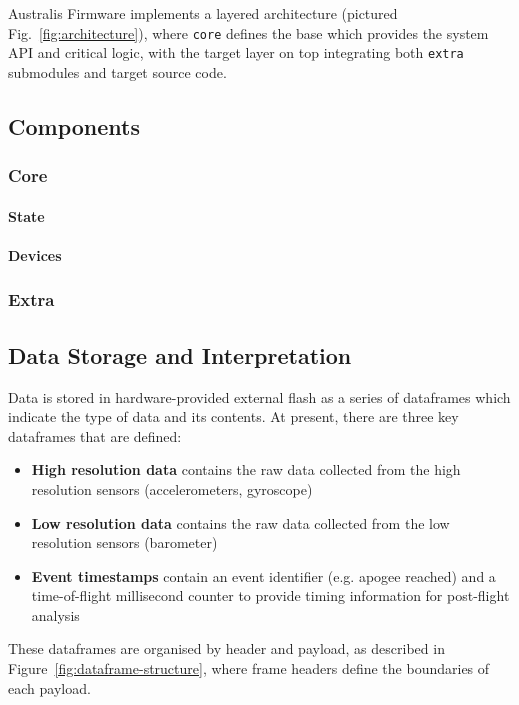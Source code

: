 Australis Firmware implements a layered architecture (pictured Fig.~\ref{fig:architecture}), where \verb|core| defines the base which provides the system API and critical logic, with the target layer on top integrating both \verb|extra| submodules and target source code.

\subsection{Components}

\subsubsection{Core}
\paragraph{State}
\paragraph{Devices}

\subsubsection{Extra}

\subsection{Data Storage and Interpretation}
Data is stored in hardware-provided external flash as a series of dataframes which indicate the type of data and its contents. At present, there are three key dataframes that are defined: 

\vspace{-0.5em}
\begin{itemize}
    \item \textbf{High resolution data} contains the raw data collected from the high resolution sensors (accelerometers, gyroscope)
    \item \textbf{Low resolution data} contains the raw data collected from the low resolution sensors (barometer)
    \item \textbf{Event timestamps} contain an event identifier (e.g. apogee reached) and a time-of-flight millisecond counter to provide timing information for post-flight analysis
\end{itemize}

These dataframes are organised by header and payload, as described in Figure~\ref{fig:dataframe-structure}, where frame headers define the boundaries of each payload.

